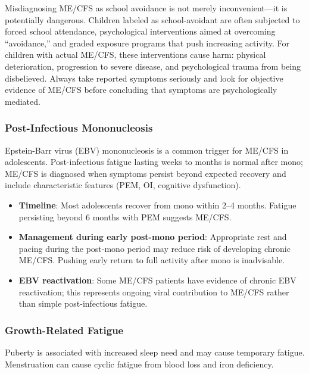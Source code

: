 \begin{practicalwarning}
Misdiagnosing ME/CFS as school avoidance is not merely inconvenient---it is potentially dangerous. Children labeled as school-avoidant are often subjected to forced school attendance, psychological interventions aimed at overcoming ``avoidance,'' and graded exposure programs that push increasing activity. For children with actual ME/CFS, these interventions cause harm: physical deterioration, progression to severe disease, and psychological trauma from being disbelieved. Always take reported symptoms seriously and look for objective evidence of ME/CFS before concluding that symptoms are psychologically mediated.
\end{practicalwarning}

\subsubsection{Post-Infectious Mononucleosis}

Epstein-Barr virus (EBV) mononucleosis is a common trigger for ME/CFS in adolescents. Post-infectious fatigue lasting weeks to months is normal after mono; ME/CFS is diagnosed when symptoms persist beyond expected recovery and include characteristic features (PEM, OI, cognitive dysfunction).

\begin{itemize}
    \item \textbf{Timeline}: Most adolescents recover from mono within 2--4 months. Fatigue persisting beyond 6 months with PEM suggests ME/CFS.
    \item \textbf{Management during early post-mono period}: Appropriate rest and pacing during the post-mono period may reduce risk of developing chronic ME/CFS. Pushing early return to full activity after mono is inadvisable.
    \item \textbf{EBV reactivation}: Some ME/CFS patients have evidence of chronic EBV reactivation; this represents ongoing viral contribution to ME/CFS rather than simple post-infectious fatigue.
\end{itemize}

\subsubsection{Growth-Related Fatigue}

Puberty is associated with increased sleep need and may cause temporary fatigue. Menstruation can cause cyclic fatigue from blood loss and iron deficiency.

